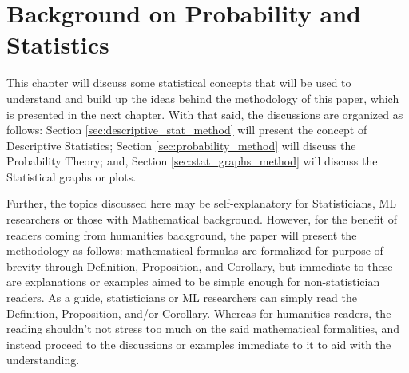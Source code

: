 \chapter{Background on Probability and Statistics}\label{ch:statistics}
This chapter will discuss some statistical concepts that will be used to understand and build up the ideas behind the methodology of this paper, which is presented in the next chapter. With that said, the discussions are organized as follows: Section \ref{sec:descriptive_stat_method} will present the concept of Descriptive Statistics; Section \ref{sec:probability_method} will discuss the Probability Theory; and, Section \ref{sec:stat_graphs_method} will discuss the Statistical graphs or plots.

Further, the topics discussed here may be self-explanatory for Statisticians, ML researchers or those with Mathematical background. However, for the benefit of readers coming from humanities background, the paper will present the methodology as follows: mathematical formulas are formalized for purpose of brevity through Definition, Proposition, and Corollary, but immediate to these are explanations or examples aimed to be simple enough for non-statistician readers. As a guide, statisticians or ML researchers can simply read the Definition, Proposition, and/or Corollary. Whereas for humanities readers, the reading shouldn't not stress too much on the said mathematical formalities, and instead proceed to the discussions or examples immediate to it to aid with the understanding.
